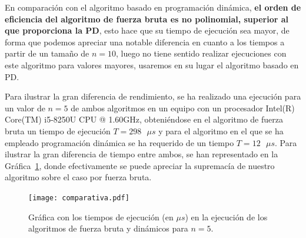 En comparación con el algoritmo basado en programación dinámica, \textbf{el orden de eficiencia del algoritmo de fuerza bruta es no polinomial, superior al que proporciona la PD}, esto hace que su tiempo de ejecución sea mayor, de forma que podemos apreciar una notable diferencia en cuanto a los tiempos a partir de un 
tamaño de $n=10$, luego no tiene sentido realizar ejecuciones con este algoritmo
para valores mayores, usaremos en su lugar el algoritmo basado en PD.

Para ilustrar la gran diferencia de rendimiento, se ha realizado una ejecución
para un valor de $n=5$ de ambos algoritmos en un equipo con un procesador 
Intel(R) Core(TM) i5-8250U CPU @ 1.60GHz, obteniéndose en el algoritmo de fuerza
bruta un tiempo de ejecución $T = 298 \text{ }\mu s $ y para el algoritmo en el que se 
ha empleado programación dinámica se ha requerido de un tiempo $ T = 12 \text{ } \mu s$. 
Para ilustrar la gran diferencia de tiempo entre ambos, se han representado en
la Gráfica~\ref{graph:comp}, donde efectivamente se puede apreciar la supremacía
de nuestro algoritmo sobre el caso por fuerza bruta. 


\begin{figure}[h]
  \centering
  \texttt{[image: comparativa.pdf]}
  \caption{Gráfica con los tiempos de ejecución (en $\mu s$) en la ejecución de los algoritmos de fuerza bruta
  y dinámicos para $n=5$. }
  \label{graph:comp}
\end{figure}